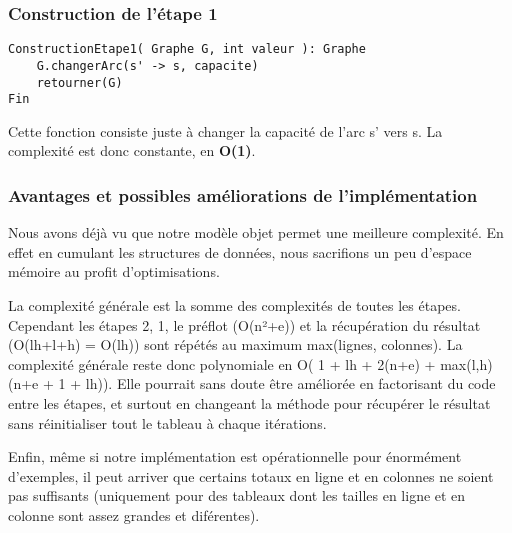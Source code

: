 \documentclass[letterpaper,12pt]{article}
\begin{document}
\subsubsection{Construction de l'étape 1}
\begin{lstlisting}
ConstructionEtape1( Graphe G, int valeur ): Graphe
    G.changerArc(s' -> s, capacite)
    retourner(G)
Fin
\end{lstlisting}
Cette fonction consiste juste à changer la capacité de l'arc s' vers s. La complexité est donc constante, en \textbf{O(1)}. 

\subsubsection{Avantages et possibles améliorations de l'implémentation}
Nous avons déjà vu que notre modèle objet permet une meilleure complexité. En effet en cumulant les structures de données, nous sacrifions un peu d'espace mémoire au profit d'optimisations. 

La complexité générale est la somme des complexités de toutes les étapes. Cependant les étapes 2, 1, le préflot (O(n²+e)) et la récupération du résultat (O(lh+l+h) = O(lh))  sont répétés au maximum max(lignes, colonnes). La complexité générale reste donc polynomiale en O( 1 + lh + 2(n+e) + max(l,h)(n+e + 1 + lh)).
Elle pourrait sans doute être améliorée en factorisant du code entre les étapes, et surtout en changeant la méthode pour récupérer le résultat sans réinitialiser tout le tableau à chaque itérations.

Enfin, même si notre implémentation est opérationnelle pour énormément d'exemples, il peut arriver que certains totaux en ligne et en colonnes ne soient pas suffisants (uniquement pour des tableaux dont les tailles en ligne et en colonne sont assez grandes et diférentes).
\end{document}

